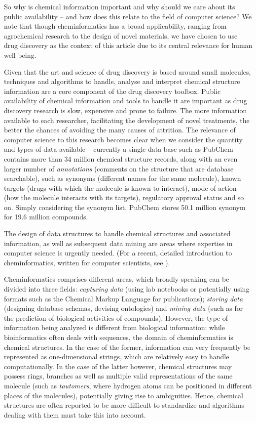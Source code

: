 \documentclass{sig-alternate}
\begin{document}
So why is chemical information important and why should we care about
its public availability -- and how does this relate to the field of
computer science? We note that though cheminformatics has a broad
applicability, ranging from agrochemical research to the design of
novel materials, we have chosen to use drug discovery as the context
of this article due to its central relevance for human well being.

Given that the art and science of drug discovery is based around small
molecules, techniques and algorithms to handle, analyse and interpret
chemical structure information are a core component of the drug
discovery toolbox. Public availability of chemical information and
tools to handle it are important as drug discovery research is slow,
expensive and prone to failure. The more information available to each
researcher, facilitating the development of novel treatments, the
better the chances of avoiding the many causes of attrition. The
relevance of computer science to this research becomes clear when we
consider the quantity and types of data available -- currently a
single data base such as PubChem contains more than 34 million
chemical structure records, along with an even larger number of
\emph{annotations} (comments on the structure that are database
searchable), such as synonyms (different names for the same molecule),
known targets (drugs with which the molecule is known to interact),
mode of action (how the molecule interacts with its targets),
regulatory approval status and so on.  Simply considering the synonym
list, PubChem stores 50.1 million synonym for 19.6 million compounds.

The design of data structures to handle chemical structures and
associated information, as well as subsequent data mining are areas
where expertise in computer science is urgently needed. (For a recent,
detailed introduction to cheminformatics, written for computer
scientists, see \cite{brown2009}).

Cheminformatics comprises different areas, which broadly speaking can
be divided into three fields: \emph{capturing data} (using lab
notebooks or potentially using formats such as the Chemical Markup
Language for publications); \emph{storing data} (designing database
schemas, devising ontologies) and \emph{mining data} (such as for the
prediction of biological activities of compounds).  However, the type
of information being analyzed is different from biological
information: while bioinformatics often deals with sequences, the
domain of cheminformatics is chemical structures. In the case of the
former, information can very frequently be represented as
one-dimensional strings, which are relatively easy to handle
computationally. In the case of the latter however, chemical
structures may possess rings, branches as well as multiple valid
representations of the same molecule (such as \emph{tautomers}, where
hydrogen atoms can be positioned in different places of the
molecules), potentially giving rise to ambiguities. Hence, chemical
structures are often reported to be more difficult to standardize and
algorithms dealing with them must take this into account.
\end{document}
